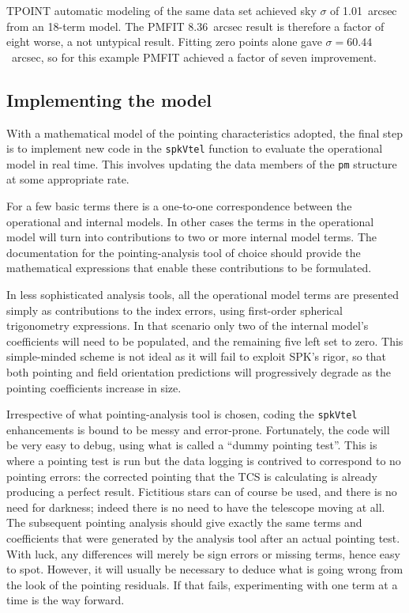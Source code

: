 \documentclass[11pt,fleqn,twoside,\paper]{article}
\renewcommand{\_}{{\tt\char'137}}     %
\begin{document}
TPOINT automatic modeling of the same data set achieved sky
$\sigma$ of 1.01~arcsec from an 18-term
model.  The PMFIT 8.36~arcsec result is therefore
a factor of eight worse, a not untypical result.  Fitting
zero points alone
gave $\sigma = 60.44$~arcsec, so for this example PMFIT
achieved a factor of seven improvement.

\subsection{Implementing the model}
\label{prt}

With a mathematical model of the pointing characteristics
adopted, the final step is to implement
new code in the {\tt spkVtel}
function to evaluate the operational model in real time.
This involves updating the data members of the
{\tt pm} structure at some appropriate rate.

For a few basic terms there is a one-to-one
correspondence between the operational and
internal models.  In other cases the terms in the operational
model will turn into contributions to two or more
internal model terms.  The documentation for the pointing-analysis
tool of choice should provide the mathematical expressions
that enable these contributions to be formulated.

In less sophisticated analysis tools, all the operational model
terms are presented simply as contributions to the index
errors, using first-order spherical trigonometry
expressions.  In that scenario
only two of the internal model's coefficients
will need to be populated,
and the remaining five left set to zero.  This simple-minded
scheme is not ideal as it will fail to exploit SPK's
rigor, so that both
pointing and field orientation predictions will progressively
degrade as the pointing coefficients increase in size.

Irrespective of what pointing-analysis tool is chosen,
coding the {\tt spkVtel} enhancements is bound to be
messy and error-prone.  Fortunately, the code will be very
easy to debug, using what is called a ``dummy pointing test''.
This is where a pointing test is run but the data
logging is contrived to
correspond to no pointing errors:  the corrected pointing
that the TCS is calculating is already producing a perfect
result.  Fictitious stars can of course be used, and there
is no need for darkness;  indeed there is
no need to have the telescope moving
at all.  The subsequent pointing analysis should give
exactly the
same terms and coefficients that were generated by the
analysis tool after an actual pointing test.  With luck, any
differences will merely be sign errors or missing terms, hence
easy to spot.  However, it will usually be necessary to deduce
what is going wrong from the look of the pointing
residuals.  If that fails, experimenting with one term at a
time is the way forward.
\end{document}
